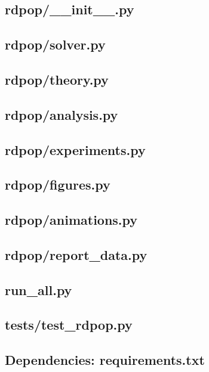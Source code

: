 \subsection{rdpop/\_\_init\_\_.py}

\subsection{rdpop/solver.py}

\subsection{rdpop/theory.py}

\subsection{rdpop/analysis.py}

\subsection{rdpop/experiments.py}

\subsection{rdpop/figures.py}

\subsection{rdpop/animations.py}

\subsection{rdpop/report\_data.py}

\subsection{run\_all.py}

\subsection{tests/test\_rdpop.py}

\subsection{Dependencies: requirements.txt}

